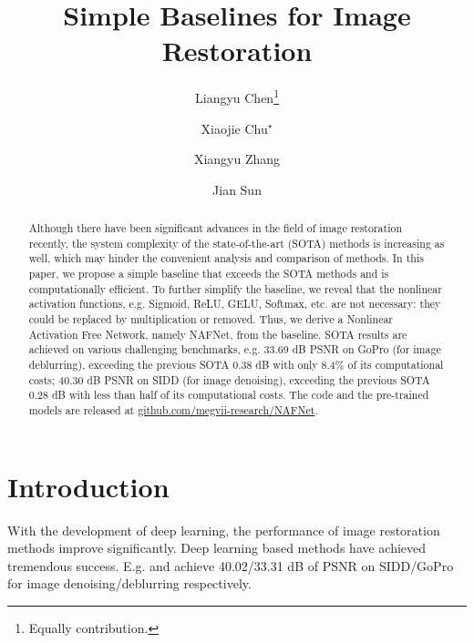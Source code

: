 \documentclass[runningheads]{llncs}
\begin{document}
\pagestyle{headings}
\mainmatter
\def\ECCVSubNumber{3043}  

\title{Simple Baselines for Image Restoration}

\begin{comment}
\titlerunning{ECCV-22 submission ID \ECCVSubNumber} 
\authorrunning{ECCV-22 submission ID \ECCVSubNumber} 
\author{Anonymous ECCV submission}
\institute{Paper ID \ECCVSubNumber}
\end{comment}




\author{Liangyu Chen\thanks{Equally contribution.} \and Xiaojie Chu$^{\star}$ \and Xiangyu Zhang \and Jian Sun\\ 
}


\maketitle

\begin{abstract}
Although there have been significant advances in the field of image restoration recently, the system complexity of the state-of-the-art (SOTA) methods is increasing as well, which may hinder the convenient analysis and comparison of methods. 
In this paper, we propose a simple baseline that exceeds the SOTA methods and is computationally efficient. 
To further simplify the baseline, we reveal that the nonlinear activation functions, e.g. Sigmoid, ReLU, GELU, Softmax, etc. are not necessary: they could be replaced by multiplication or removed. Thus, we derive a Nonlinear Activation Free Network, namely NAFNet, from the baseline. SOTA results are achieved on various challenging benchmarks, e.g. 33.69 dB PSNR on GoPro (for image deblurring), exceeding the previous SOTA 0.38 dB with only 8.4\% of its computational costs; 40.30 dB PSNR on SIDD (for image denoising), exceeding the previous SOTA 0.28 dB with less than half of its computational costs.
The code and the pre-trained models are released at \href{https://github.com/megvii-research/NAFNet}{github.com/megvii-research/NAFNet}.
\end{abstract}


\section{Introduction}
With the development of deep learning, the performance of image restoration methods improve significantly. Deep learning based methods\cite{chen2021hinet,waqas2021multi,zamir2021restormer,wang2021uformer,cheng2021nbnet,cho2021rethinking,tu2022maxim,chu2021revisiting,mao2021deep} have achieved tremendous success. E.g. \cite{zamir2021restormer} and \cite{chu2021revisiting} achieve 40.02/33.31 dB of PSNR on SIDD\cite{SIDD_2018_CVPR}/GoPro\cite{nah2017deep} for image denoising/deblurring respectively.
\end{document}
